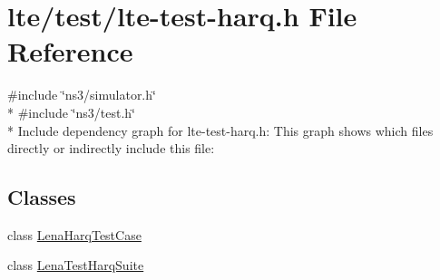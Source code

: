 \hypertarget{lte-test-harq_8h}{}\section{lte/test/lte-\/test-\/harq.h File Reference}
\label{lte-test-harq_8h}
{\ttfamily \#include \char`\"{}ns3/simulator.\+h\char`\"{}}\\*
{\ttfamily \#include \char`\"{}ns3/test.\+h\char`\"{}}\\*
Include dependency graph for lte-\/test-\/harq.h\+:
This graph shows which files directly or indirectly include this file\+:
\subsection*{Classes}
\begin{DoxyCompactItemize}
\item 
class \hyperlink{classLenaHarqTestCase}{Lena\+Harq\+Test\+Case}
\item 
class \hyperlink{classLenaTestHarqSuite}{Lena\+Test\+Harq\+Suite}
\end{DoxyCompactItemize}
